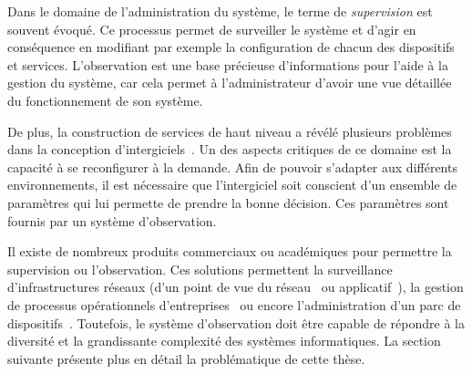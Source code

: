 Dans le domaine de l'administration du système, le terme de \textit{supervision} est souvent évoqué. Ce processus permet de surveiller le système et d'agir en conséquence en modifiant par exemple la configuration de chacun des dispositifs et services. L'observation est une base précieuse d'informations pour l'aide à la gestion du système, car cela permet à l'administrateur d'avoir une vue détaillée du fonctionnement de son système.

De plus, la construction de services de haut niveau a révélé plusieurs problèmes dans la conception d'intergiciels~\cite{Geihs:challenges}. Un des aspects critiques de ce domaine est la capacité à se reconfigurer à la demande. Afin de pouvoir s'adapter aux différents environnements, il est nécessaire que l'intergiciel soit conscient d'un ensemble de paramètres qui lui permette de prendre la bonne décision. Ces paramètres sont fournis par un système d'observation.

Il existe de nombreux produits commerciaux ou académiques pour permettre la supervision ou l'observation. Ces solutions permettent la surveillance d'infrastructures réseaux (d'un point de vue du réseau~\cite{url:zabbix} ou applicatif~\cite{url:manageengine}), la gestion de processus opérationnels d'entreprises~\cite{url:systar} ou encore l'administration d'un parc de dispositifs~\cite{IETF:SNMP}. Toutefois, le système d'observation doit être capable de répondre à la diversité et la grandissante complexité des systèmes informatiques. La section suivante présente plus en détail la problématique de cette thèse.
